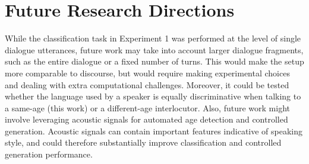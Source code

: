 
\section{Future Research Directions}

While the classification task in Experiment 1 was performed at the level of single dialogue utterances, future work may take into account larger dialogue fragments, such as the entire dialogue or a fixed number of turns. This would make the setup more comparable to discourse, but would require making experimental choices and dealing with extra computational challenges. Moreover, it could be tested whether the language used by a speaker is equally discriminative when talking to a same-age (this work) or a different-age interlocutor. Also, future work might involve leveraging acoustic signals for automated age detection and controlled generation. Acoustic signals can contain important features indicative of speaking style, and could therefore substantially improve classification and controlled generation performance.

